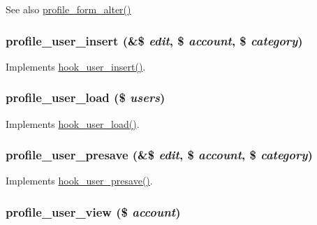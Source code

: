 \begin{DoxySeeAlso}{See also}
\hyperlink{profile_8module_a1797a78888154f866995232f20ece3e5}{profile\_\-form\_\-alter()} 
\end{DoxySeeAlso}
\hypertarget{profile_8module_a7384c7127204e134d2be695e53681f4b}{
\subsubsection[{profile\_\-user\_\-insert}]{\setlength{\rightskip}{0pt plus 5cm}profile\_\-user\_\-insert (\&\$ {\em edit}, \/  \$ {\em account}, \/  \$ {\em category})}}
\label{profile_8module_a7384c7127204e134d2be695e53681f4b}
Implements \hyperlink{group__hooks_gaa3e2c4c972ee796d216b15da7aaf9c2c}{hook\_\-user\_\-insert()}. \hypertarget{profile_8module_a8e273f03e749b1a38f2891d138675b73}{
\subsubsection[{profile\_\-user\_\-load}]{\setlength{\rightskip}{0pt plus 5cm}profile\_\-user\_\-load (\$ {\em users})}}
\label{profile_8module_a8e273f03e749b1a38f2891d138675b73}
Implements \hyperlink{group__hooks_ga81027843e38de3a899fa6e72f876d6b6}{hook\_\-user\_\-load()}. \hypertarget{profile_8module_ac4241448415efd43523285a54e36ab85}{
\subsubsection[{profile\_\-user\_\-presave}]{\setlength{\rightskip}{0pt plus 5cm}profile\_\-user\_\-presave (\&\$ {\em edit}, \/  \$ {\em account}, \/  \$ {\em category})}}
\label{profile_8module_ac4241448415efd43523285a54e36ab85}
Implements \hyperlink{group__hooks_gab6b224c35d7d97259d4350a7849f1e56}{hook\_\-user\_\-presave()}. \hypertarget{profile_8module_a41afe6040449cd3066939e034cdd7b57}{
\subsubsection[{profile\_\-user\_\-view}]{\setlength{\rightskip}{0pt plus 5cm}profile\_\-user\_\-view (\$ {\em account})}}
